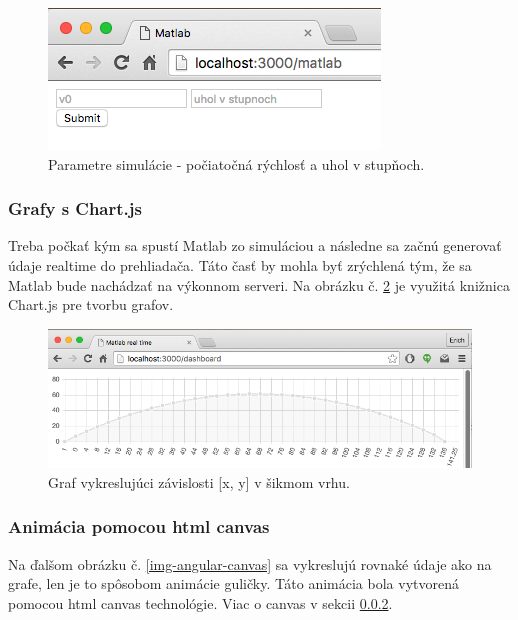 \begin{figure}[H]
  \centering
  \includegraphics[scale=0.7]{img/code/angular-simulation-param.png}
  \caption{Parametre simulácie - počiatočná rýchlosť a uhol v stupňoch.}
  \label{img-angular-params}
\end{figure}


\subsubsection{Grafy s Chart.js}

Treba počkať kým sa spustí Matlab zo simuláciou a následne sa začnú generovať údaje realtime do prehliadača. Táto časť by mohla byť zrýchlená tým, že sa Matlab bude nachádzať na výkonnom serveri. Na obrázku č. \ref{img-angular-chartjs} je využitá knižnica Chart.js pre tvorbu grafov.

\begin{figure}[H]
  \centering
  \includegraphics[scale=0.5]{img/code/angular-chartjs.png}
  \caption{Graf vykreslujúci závislosti [x, y] v šikmom vrhu.}
  \label{img-angular-chartjs}
\end{figure}

\subsubsection{Animácia pomocou html canvas}\label{section-canvas}

Na ďalšom obrázku č. \ref{img-angular-canvas} sa vykreslujú rovnaké údaje ako na grafe, len je to spôsobom animácie guličky. Táto animácia bola vytvorená pomocou html canvas technológie. Viac o canvas v sekcii \ref{section-canvas}.

